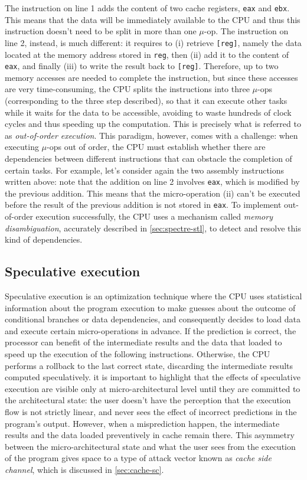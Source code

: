 \documentclass[12pt,a4paper]{book}
\theoremstyle{definition}
\begin{document}
	The instruction on line 1 adds the content of two cache registers, \texttt{eax} and \texttt{ebx}. This means that the data will be immediately available to the CPU and thus this instruction doesn't need to be split in more than one $\mu$-op. The instruction on line 2, instead, is much different: it requires to (i) retrieve \texttt{[reg]}, namely the data located at the memory address stored in \texttt{reg}, then (ii) add it to the content of \texttt{eax}, and finally (iii) to write the result back to \texttt{[reg]}. Therefore, up to two memory accesses are needed to complete the instruction, but since these accesses are very time-consuming, the CPU splits the instructions into three $\mu$-ops (corresponding to the three step described), so that it can execute other tasks while it waits for the data to be accessible, avoiding to waste hundreds of clock cycles and thus speeding up the computation. This is precisely what is referred to as \textit{out-of-order execution}. This paradigm, however, comes with a challenge: when executing $\mu$-ops out of order, the CPU must establish whether there are dependencies between different instructions that can obstacle the completion of certain tasks.	For example, let's consider again the two assembly instructions written above: note that the addition on line 2 involves \texttt{eax}, which is modified by the previous addition. This means that the micro-operation (ii) can't be executed before the result of the previous addition is not stored in \texttt{eax}. To implement out-of-order execution successfully, the CPU uses a mechanism called \textit{memory disambiguation}, accurately described in \ref{sec:spectre-stl}, to detect and resolve this kind of dependencies. 
	
	\subsection{Speculative execution}\label{sec:speculative-exec}
	Speculative execution is an optimization technique where the CPU uses statistical information about the program execution to make guesses about the outcome of conditional branches or data dependencies, and consequently decides to load data and execute certain micro-operations in advance. If the prediction is correct, the processor can benefit of the intermediate results and the data that loaded to speed up the execution of the following instructions. Otherwise, the CPU performs a rollback to the last correct state, discarding the intermediate results computed speculatively. it is important to highlight that the effects of speculative execution are visible only at micro-architectural level until they are committed to the architectural state: the user doesn't have the perception that the execution flow is not strictly linear, and never sees the effect of incorrect predictions in the program's output. However, when a misprediction happen, the intermediate results and the data loaded preventively in cache remain there. This asymmetry between the micro-architectural state and what the user sees from the execution of the program gives space to a type of attack vector known as \textit{cache side channel}, which is discussed in \ref{sec:cache-sc}.
	
\end{document}
